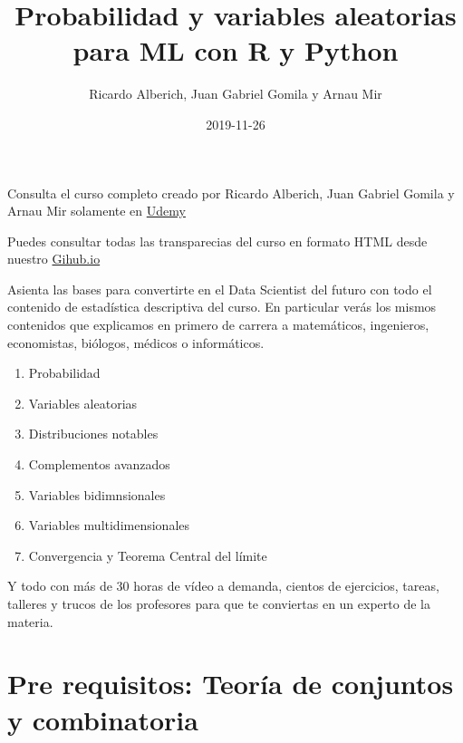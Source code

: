 \documentclass[]{book}
\title{Probabilidad y variables aleatorias para ML con R y Python}
\author{Ricardo Alberich, Juan Gabriel Gomila y Arnau Mir}
\date{2019-11-26}
\providecommand{\tightlist}{%
  \setlength{\itemsep}{0pt}\setlength{\parskip}{0pt}}
\begin{document}
\maketitle

{
\setcounter{tocdepth}{1}
\tableofcontents
}
\hypertarget{section}{%
\chapter*{}\label{section}}

Consulta el curso completo creado por Ricardo Alberich, Juan Gabriel Gomila y Arnau Mir solamente en \href{https://www.udemy.com/course/probabilidad-y-variables-aleatorias-para-ml-con-r-y-python/?couponCode=B85F8D52148DF5AAD8F7}{Udemy}

Puedes consultar todas las transparecias del curso en formato HTML desde nuestro \href{https://joanby.github.io/probabilidad/}{Gihub.io}

Asienta las bases para convertirte en el Data Scientist del futuro con todo el contenido de estadística descriptiva del curso. En particular verás los mismos contenidos que explicamos en primero de carrera a matemáticos, ingenieros, economistas, biólogos, médicos o informáticos.

\begin{enumerate}
\def\labelenumi{\arabic{enumi}.}
\tightlist
\item
  Probabilidad
\item
  Variables aleatorias
\item
  Distribuciones notables
\item
  Complementos avanzados
\item
  Variables bidimnsionales
\item
  Variables multidimensionales
\item
  Convergencia y Teorema Central del límite
\end{enumerate}

Y todo con más de 30 horas de vídeo a demanda, cientos de ejercicios, tareas, talleres y trucos de los profesores para que te conviertas en un experto de la materia.

\hypertarget{pre-requisitos-teoruxeda-de-conjuntos-y-combinatoria}{%
\chapter*{Pre requisitos: Teoría de conjuntos y combinatoria}\label{pre-requisitos-teoruxeda-de-conjuntos-y-combinatoria}}
\end{document}
